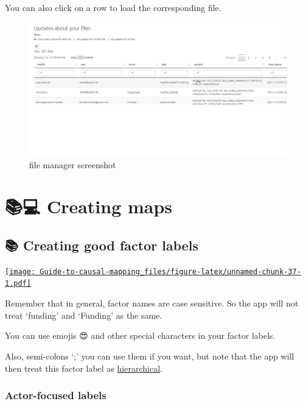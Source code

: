 \documentclass[
]{book}
\begin{document}
You can also click on a row to load the corresponding file.

\begin{figure}
\centering
\includegraphics[width=6.77083in,height=\textheight]{_assets/file manager screenshot-16376049547992.png}
\caption{file manager screenshot}
\end{figure}

\hypertarget{part-creating-maps}{%
\part{📚💻 Creating maps}\label{part-creating-maps}}

\hypertarget{creating-good-factor-labels}{%
\chapter{📚 Creating good factor labels}\label{creating-good-factor-labels}}

\href{https://player.vimeo.com/video/580212681}{\texttt{[image: Guide-to-causal-mapping\_files/figure-latex/unnamed-chunk-37-1.pdf]}}

Remember that in general, factor names are case sensitive. So the app will not treat `funding' and `Funding' as the same.

You can use emojis 😍 and other special characters in your factor labels.

Also, semi-colons `;' you can use them if you want, but note that the app will then treat this factor label as \protect\hyperlink{xhierarchical-coding}{hierarchical}.

\hypertarget{actor-focused-labels}{%
\section{Actor-focused labels}\label{actor-focused-labels}}
\end{document}

